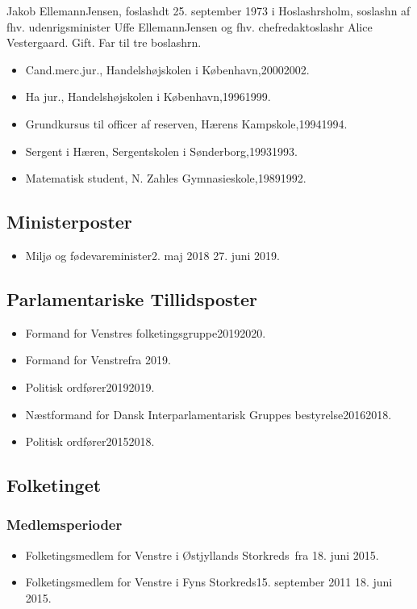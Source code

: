 \documentclass[11pt, a4paper]{awesome-cv}
\begin{document}
\makecvheader[R]
\makelettertitle
\begin{cvletter}
Jakob EllemannJensen, foslashdt 25. september 1973 i Hoslashrsholm, soslashn af fhv. udenrigsminister Uffe EllemannJensen og fhv. chefredaktoslashr Alice Vestergaard. Gift. Far til tre boslashrn.

\begin{itemize}
\item Cand.merc.jur., Handelshøjskolen i København,20002002.
\item Ha jur., Handelshøjskolen i København,19961999.
\item Grundkursus til officer af reserven, Hærens Kampskole,19941994.
\item Sergent i Hæren, Sergentskolen i Sønderborg,19931993.
\item Matematisk student, N. Zahles Gymnasieskole,19891992.
\end{itemize}
\subsection*{Ministerposter}
\begin{itemize}
\item Miljø og fødevareminister2. maj 2018  27. juni 2019.
\end{itemize}
\subsection*{Parlamentariske Tillidsposter}
\begin{itemize}
\item Formand for Venstres folketingsgruppe20192020.
\item Formand for Venstrefra 2019.
\item Politisk ordfører20192019.
\item Næstformand for Dansk Interparlamentarisk Gruppes bestyrelse20162018.
\item Politisk ordfører20152018.
\end{itemize}
\subsection*{Folketinget}
\subsubsection*{Medlemsperioder}
\begin{itemize}
\item Folketingsmedlem for Venstre i Østjyllands Storkreds fra 18. juni 2015.
\item Folketingsmedlem for Venstre i Fyns Storkreds15. september 2011  18. juni 2015.
\end{itemize}

\end{cvletter}
\end{document}
